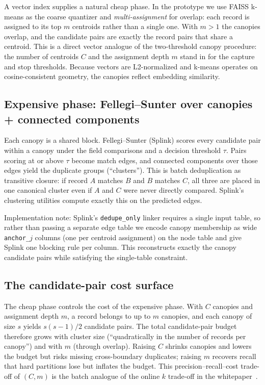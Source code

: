 \documentclass[11pt]{article}
\begin{document}
A vector index supplies a natural cheap phase. In the prototype we use FAISS k-means as the
coarse quantizer and \emph{multi-assignment} for overlap: each record is assigned to its top
$m$ centroids rather than a single one. With $m>1$ the canopies overlap, and the candidate
pairs are exactly the record pairs that share a centroid. This is a direct vector analogue of
the two-threshold canopy procedure: the number of centroids $C$ and the assignment depth $m$
stand in for the capture and stop thresholds. Because vectors are L2-normalized and k-means
operates on cosine-consistent geometry, the canopies reflect embedding similarity.

\subsection{Expensive phase: Fellegi--Sunter over canopies + connected components}
Each canopy is a shared block. Fellegi--Sunter (Splink) scores every candidate pair within a
canopy under the field comparisons and a decision threshold $\tau$. Pairs scoring at or above
$\tau$ become match edges, and connected components over those edges yield the duplicate groups
(``clusters''). This is batch deduplication as transitive closure: if record $A$ matches $B$
and $B$ matches $C$, all three are placed in one canonical cluster even if $A$ and $C$ were
never directly compared. Splink's clustering utilities compute exactly this on the predicted
edges.

Implementation note: Splink's \texttt{dedupe\_only} linker requires a single input table, so
rather than passing a separate edge table we encode canopy membership as wide
\texttt{anchor\_$j$} columns (one per centroid assignment) on the node table and give Splink
one blocking rule per column. This reconstructs exactly the canopy candidate pairs while
satisfying the single-table constraint.

\subsection{The candidate-pair cost surface}
The cheap phase controls the cost of the expensive phase. With $C$ canopies and assignment
depth $m$, a record belongs to up to $m$ canopies, and each canopy of size $s$ yields
$s(s-1)/2$ candidate pairs. The total candidate-pair budget therefore grows with cluster
size (``quadratically in the number of records per canopy'') and with $m$ (through overlap).
Raising $C$ shrinks canopies and lowers the budget but risks missing cross-boundary
duplicates; raising $m$ recovers recall that hard partitions lose but inflates the budget.
This precision--recall--cost trade-off of $(C,m)$ is the batch analogue of the online $k$
trade-off in the whitepaper~\cite{pipeline}.
\end{document}

